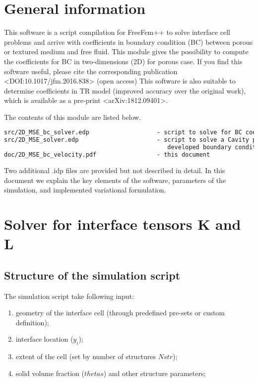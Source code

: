 \documentclass[12pt,a4paper]{article}
\begin{document}
\sloppy

\section{General information}

This software is a script compilation for FreeFem++ to solve interface cell problems and arrive
with coefficients in boundary condition (BC) between porous or textured medium and free fluid.
This module gives the possibility to compute the coefficients for BC in two-dimensions (2D) for
porous case. If you find this software useful, please cite the corresponding
publication <DOI:10.1017/jfm.2016.838> (open access) This software is also
suitable to determine coefficients in TR model (improved accuracy over the original work), which
is available as a pre-print <arXiv:1812.09401>.

The contents of this module are listed below.
\begin{lstlisting}[language=tex]
src/2D_MSE_bc_solver.edp                   - script to solve for BC coefficients tensor
src/2D_MSE_solver.edp                      - script to solve a Cavity problem with
                                              developed boundary conditions
doc/2D_MSE_bc_velocity.pdf                 - this document
\end{lstlisting}

Two additional .idp files are provided but not described in detail. In this document we explain the key elements of the software, parameters of the simulation, and implemented variational formulation.

\section{Solver for interface tensors K and L}

\subsection{Structure of the simulation script}

The simulation script take following input:
\begin{enumerate}
    \item geometry of the interface cell (through predefined pre-sets or custom definition);
	\item interface location ($y_i$);
    \item extent of the cell (set by number of structures $Nstr$);
    \item solid volume fraction ($thetas$) and other structure parameters;
\end{enumerate}
\end{document}
